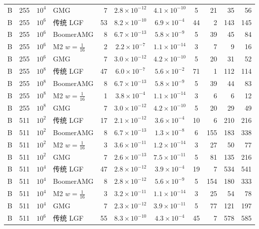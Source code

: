 \begin{longtable}{lrrlrcccrrr}
B & 255 & $10^{4}$ & GMG & 7 & $2.8{\times}10^{-12}$ & $4.1{\times}10^{-10}$ & 5 & 21 & 35 & 56 \\
B & 255 & $10^{6}$ & 传统 LGF & 53 & $8.2{\times}10^{-10}$ & $6.9{\times}10^{-4}$ & 44 & 2 & 143 & 145 \\
B & 255 & $10^{6}$ & BoomerAMG & 8 & $6.7{\times}10^{-13}$ & $5.8{\times}10^{-9}$ & 5 & 39 & 45 & 84 \\
B & 255 & $10^{6}$ & M2 $w{=}\frac1{16}$ & 2 & $2.2{\times}10^{-7}$ & $1.1{\times}10^{-14}$ & 3 & 7 & 9 & 16 \\
B & 255 & $10^{6}$ & GMG & 7 & $3.0{\times}10^{-12}$ & $4.2{\times}10^{-10}$ & 5 & 20 & 31 & 52 \\
B & 255 & $10^{8}$ & 传统 LGF & 47 & $6.0{\times}10^{-7}$ & $5.6{\times}10^{-2}$ & 71 & 1 & 112 & 114 \\
B & 255 & $10^{8}$ & BoomerAMG & 8 & $6.7{\times}10^{-13}$ & $5.8{\times}10^{-9}$ & 5 & 39 & 44 & 83 \\
B & 255 & $10^{8}$ & M2 $w{=}\frac1{16}$ & 1 & $3.8{\times}10^{-4}$ & $1.1{\times}10^{-14}$ & 3 & 6 & 6 & 12 \\
B & 255 & $10^{8}$ & GMG & 7 & $3.0{\times}10^{-12}$ & $4.2{\times}10^{-10}$ & 5 & 20 & 29 & 49 \\
B & 511 & $10^{2}$ & 传统 LGF & 17 & $2.1{\times}10^{-12}$ & $3.6{\times}10^{-4}$ & 10 & 6 & 210 & 216 \\
B & 511 & $10^{2}$ & BoomerAMG & 8 & $6.7{\times}10^{-13}$ & $1.3{\times}10^{-8}$ & 6 & 155 & 183 & 338 \\
B & 511 & $10^{2}$ & M2 $w{=}\frac1{16}$ & 3 & $3.6{\times}10^{-11}$ & $1.2{\times}10^{-14}$ & 3 & 27 & 50 & 77 \\
B & 511 & $10^{2}$ & GMG & 7 & $2.6{\times}10^{-13}$ & $7.5{\times}10^{-11}$ & 5 & 81 & 135 & 216 \\
B & 511 & $10^{4}$ & 传统 LGF & 47 & $2.8{\times}10^{-12}$ & $3.9{\times}10^{-4}$ & 19 & 7 & 534 & 541 \\
B & 511 & $10^{4}$ & BoomerAMG & 8 & $2.8{\times}10^{-12}$ & $5.6{\times}10^{-9}$ & 5 & 154 & 180 & 333 \\
B & 511 & $10^{4}$ & M2 $w{=}\frac1{16}$ & 3 & $3.2{\times}10^{-11}$ & $1.1{\times}10^{-14}$ & 3 & 25 & 54 & 78 \\
B & 511 & $10^{4}$ & GMG & 7 & $2.3{\times}10^{-12}$ & $3.9{\times}10^{-11}$ & 5 & 77 & 121 & 197 \\
B & 511 & $10^{6}$ & 传统 LGF & 55 & $8.3{\times}10^{-10}$ & $4.3{\times}10^{-4}$ & 45 & 7 & 578 & 585 \\

\end{longtable}
